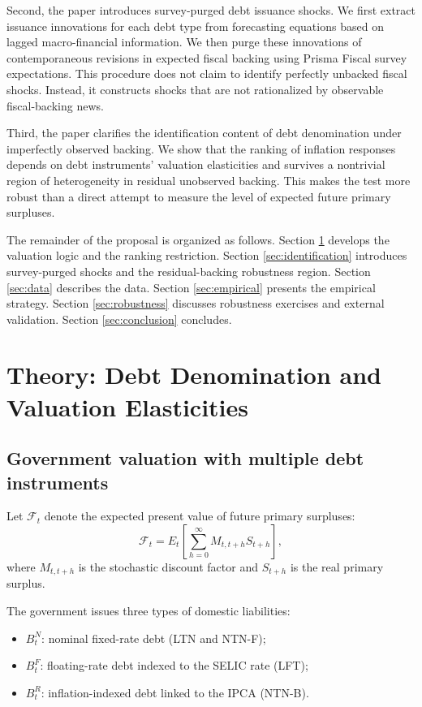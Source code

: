 \documentclass[12pt,a4paper]{article}
\begin{document}
Second, the paper introduces survey-purged debt issuance shocks. We first extract issuance innovations for each debt type from forecasting equations based on lagged macro-financial information. We then purge these innovations of contemporaneous revisions in expected fiscal backing using Prisma Fiscal survey expectations. This procedure does not claim to identify perfectly unbacked fiscal shocks. Instead, it constructs shocks that are not rationalized by observable fiscal-backing news.

Third, the paper clarifies the identification content of debt denomination under imperfectly observed backing. We show that the ranking of inflation responses depends on debt instruments' valuation elasticities and survives a nontrivial region of heterogeneity in residual unobserved backing. This makes the test more robust than a direct attempt to measure the level of expected future primary surpluses.

The remainder of the proposal is organized as follows. Section \ref{sec:theory} develops the valuation logic and the ranking restriction. Section \ref{sec:identification} introduces survey-purged shocks and the residual-backing robustness region. Section \ref{sec:data} describes the data. Section \ref{sec:empirical} presents the empirical strategy. Section \ref{sec:robustness} discusses robustness exercises and external validation. Section \ref{sec:conclusion} concludes.

\section{Theory: Debt Denomination and Valuation Elasticities}
\label{sec:theory}

\subsection{Government valuation with multiple debt instruments}

Let \(\mathcal{F}_t\) denote the expected present value of future primary surpluses:
\begin{equation}
\mathcal{F}_t
=
E_t\left[\sum_{h=0}^{\infty} M_{t,t+h} S_{t+h}\right],
\label{eq:fiscal_backing}
\end{equation}
where \(M_{t,t+h}\) is the stochastic discount factor and \(S_{t+h}\) is the real primary surplus.

The government issues three types of domestic liabilities:
\begin{itemize}[leftmargin=1.2cm]
    \item \(B_t^N\): nominal fixed-rate debt (LTN and NTN-F);
    \item \(B_t^F\): floating-rate debt indexed to the SELIC rate (LFT);
    \item \(B_t^R\): inflation-indexed debt linked to the IPCA (NTN-B).
\end{itemize}
\end{document}
